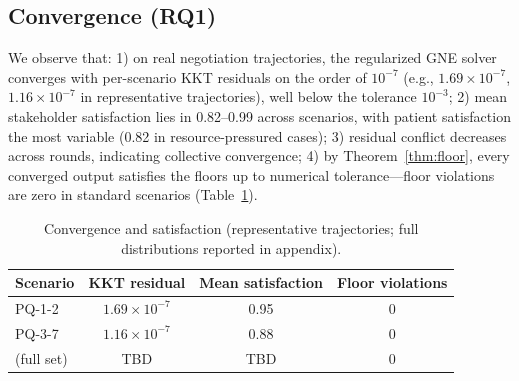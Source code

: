 \documentclass[11pt]{article}
\begin{document}
\subsection{Convergence (RQ1)}
\label{sec:rq1}
We observe that: 1) on real negotiation trajectories, the regularized GNE
solver converges with per-scenario KKT residuals on the order of $10^{-7}$
(e.g., $1.69\times10^{-7}$, $1.16\times10^{-7}$ in representative
trajectories), well below the tolerance $10^{-3}$; 2) mean stakeholder
satisfaction lies in 0.82--0.99 across scenarios, with patient satisfaction
the most variable (0.82 in resource-pressured cases); 3) residual conflict
decreases across rounds, indicating collective convergence; 4) by
Theorem~\ref{thm:floor}, every converged output satisfies the floors up to
numerical tolerance---floor violations are zero in standard scenarios
(Table~\ref{tab:main}).
\begin{table}[t]
  \centering
  \caption{Convergence and satisfaction (representative trajectories; full
  distributions reported in appendix).}
  \label{tab:main}
  \begin{tabular}{lccc}
    \toprule
    Scenario & KKT residual & Mean satisfaction & Floor violations \\
    \midrule
    PQ-1-2 & $1.69\times10^{-7}$ & 0.95 & 0 \\
    PQ-3-7 & $1.16\times10^{-7}$ & 0.88 & 0 \\
    (full set) & TBD & TBD & 0 \\
    \bottomrule
  \end{tabular}
\end{table}
\end{document}
